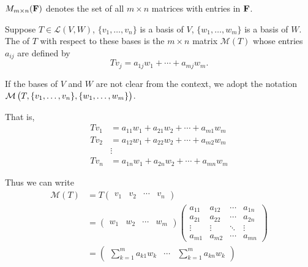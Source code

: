 \begin{notation}
$M_{m\times n}(\mathbf F)$ denotes the set of all $m\times n$ matrices with entries in $\mathbf F$.
\end{notation}

\begin{definition}
Suppose $T\in\mathcal{L}(V,W)$, $\{v_1,\dots,v_n\}$ is a basis of $V$, $\{w_1,\dots,w_m\}$ is a basis of $W$. The  of $T$ with respect to these bases is the $m\times n$ matrix $\mathcal{M}(T)$ whose entries $a_{ij}$ are defined by
\[Tv_j=a_{1j}w_1+\cdots+a_{mj}w_m.\]
\end{definition}

\begin{notation}
If the bases of $V$ and $W$ are not clear from the context, we adopt the notation $\mathcal{M}\left(T,\{v_1,\dots,v_n\},\{w_1,\dots,w_m\}\right)$.
\end{notation}

That is,
\begin{align*}
Tv_1&=a_{11}w_1+a_{21}w_2+\cdots+a_{m1}w_m\\
Tv_2&=a_{12}w_1+a_{22}w_2+\cdots+a_{m2}w_m\\
&\vdots\\
Tv_n&=a_{1n}w_1+a_{2n}w_2+\cdots+a_{mn}w_m
\end{align*}

Thus we can write
\begin{align*}
\mathcal{M}(T)&=T\begin{pmatrix}
v_1&v_2&\cdots&v_n
\end{pmatrix}\\
&=\begin{pmatrix}
w_1&w_2&\cdots&w_m
\end{pmatrix}
\begin{pmatrix}
a_{11}&a_{12}&\cdots&a_{1n}\\
a_{21}&a_{22}&\cdots&a_{2n}\\
\vdots&\vdots&\ddots&\vdots\\
a_{m1}&a_{m2}&\cdots&a_{mn}
\end{pmatrix}\\
&=\begin{pmatrix}
\sum_{k=1}^{m}a_{k1}w_k & \cdots & \sum_{k=1}^{m}a_{kn}w_k
\end{pmatrix}
\end{align*}

